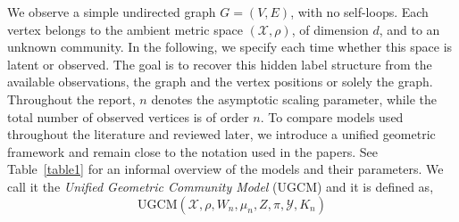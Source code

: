 \documentclass[runningheads]{llncs}
\begin{document}
We observe a simple undirected graph \(G=(V,E)\), with no self-loops. Each vertex belongs to the ambient metric space \((\mathcal X, \rho)\), of dimension \(d\), and to an unknown community. In the following, we specify each time whether this space is latent or observed. The goal is to recover this hidden label structure from the available observations, the graph and the vertex positions or solely the graph. Throughout the report, \(n\) denotes the asymptotic scaling parameter, while the total number of observed vertices is of order \(n\).
To compare models used throughout the literature and reviewed later, we introduce a unified geometric framework and remain close to the notation used in the papers. See Table~\ref{table1} for an informal overview of the models and their parameters.
We call it the \textit{Unified Geometric Community Model} (UGCM) and it is defined as,
\[
\mathrm{UGCM} \left( \mathcal X, \rho, W_n, \mu_n, Z, \pi, \mathcal Y, K_n \right)
\] 
\end{document}
